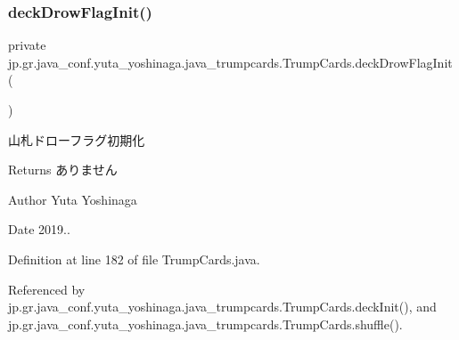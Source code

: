 \mbox{\label{classjp_1_1gr_1_1java__conf_1_1yuta__yoshinaga_1_1java__trumpcards_1_1_trump_cards_aa1db686e11e2c281976505d527eaffbd}} 
\subsubsection{\texorpdfstring{deck\+Drow\+Flag\+Init()}{deckDrowFlagInit()}}
{\footnotesize\ttfamily private jp.\+gr.\+java\+\_\+conf.\+yuta\+\_\+yoshinaga.\+java\+\_\+trumpcards.\+Trump\+Cards.\+deck\+Drow\+Flag\+Init (\begin{DoxyParamCaption}{ }\end{DoxyParamCaption})\hspace{0.3cm}{\ttfamily [private]}}



山札ドローフラグ初期化 

\begin{DoxyReturn}{Returns}
ありません 
\end{DoxyReturn}
\begin{DoxyAuthor}{Author}
Yuta Yoshinaga 
\end{DoxyAuthor}
\begin{DoxyDate}{Date}
2019.. 
\end{DoxyDate}


Definition at line 182 of file Trump\+Cards.\+java.



Referenced by jp.\+gr.\+java\+\_\+conf.\+yuta\+\_\+yoshinaga.\+java\+\_\+trumpcards.\+Trump\+Cards.\+deck\+Init(), and jp.\+gr.\+java\+\_\+conf.\+yuta\+\_\+yoshinaga.\+java\+\_\+trumpcards.\+Trump\+Cards.\+shuffle().

